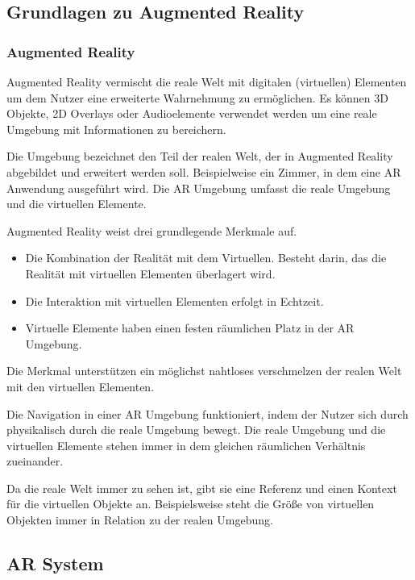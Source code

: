\subsection{Grundlagen zu Augmented Reality}
\subsubsection{Augmented Reality} %

Augmented Reality vermischt die reale Welt mit digitalen (virtuellen) Elementen um dem Nutzer eine erweiterte Wahrnehmung zu ermöglichen. Es können 3D Objekte, 2D Overlays oder Audioelemente verwendet werden um eine reale Umgebung mit Informationen zu bereichern. 

Die Umgebung bezeichnet den Teil der realen Welt, der in Augmented Reality abgebildet und erweitert werden soll. Beispielweise ein Zimmer, in dem eine AR Anwendung ausgeführt wird.
Die AR Umgebung umfasst die reale Umgebung und die virtuellen Elemente.

Augmented Reality weist drei grundlegende Merkmale auf. 
\begin{itemize}
	\item Die Kombination der Realität mit dem Virtuellen. Besteht darin, das die Realität mit virtuellen Elementen überlagert wird.
	\item Die Interaktion mit virtuellen Elementen erfolgt in Echtzeit.
	\item Virtuelle Elemente haben einen festen räumlichen Platz in der AR Umgebung.
\end{itemize}

Die Merkmal unterstützen ein möglichst nahtloses verschmelzen der realen Welt mit den virtuellen Elementen.

Die Navigation in einer AR Umgebung funktioniert, indem der Nutzer sich durch physikalisch durch die reale Umgebung bewegt. Die reale Umgebung und die virtuellen Elemente stehen immer in dem gleichen räumlichen Verhältnis zueinander.

Da die reale Welt immer zu sehen ist, gibt sie eine Referenz und einen Kontext für die virtuellen Objekte an. 
Beispielsweise steht die Größe von virtuellen Objekten immer in Relation zu der realen Umgebung.\citep{GrundlagenAR}


\subsection{AR System}

